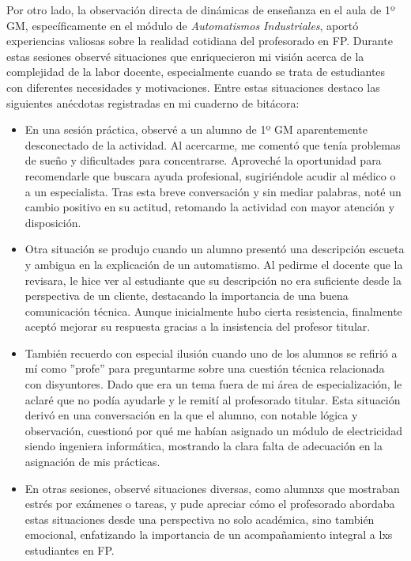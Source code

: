Por otro lado, la observación directa de dinámicas de enseñanza en el aula de 1º GM, específicamente en el módulo de \textit{Automatismos Industriales}, aportó experiencias valiosas sobre la realidad cotidiana del profesorado en FP. Durante estas sesiones observé situaciones que enriquecieron mi visión acerca de la complejidad de la labor docente, especialmente cuando se trata de estudiantes con diferentes necesidades y motivaciones. Entre estas situaciones destaco las siguientes anécdotas registradas en mi cuaderno de bitácora:

\begin{itemize} %
    \item En una sesión práctica, observé a un alumno de 1º GM aparentemente desconectado de la actividad. Al acercarme, me comentó que tenía problemas de sueño y dificultades para concentrarse. Aproveché la oportunidad para recomendarle que buscara ayuda profesional, sugiriéndole acudir al médico o a un especialista. Tras esta breve conversación y sin mediar palabras, noté un cambio positivo en su actitud, retomando la actividad con mayor atención y disposición.
    
    \item Otra situación se produjo cuando un alumno presentó una descripción escueta y ambigua en la explicación de un automatismo. Al pedirme el docente que la revisara, le hice ver al estudiante que su descripción no era suficiente desde la perspectiva de un cliente, destacando la importancia de una buena comunicación técnica. Aunque inicialmente hubo cierta resistencia, finalmente aceptó mejorar su respuesta gracias a la insistencia del profesor titular.
    
    \item También recuerdo con especial ilusión cuando uno de los alumnos se refirió a mí como ''profe'' para preguntarme sobre una cuestión técnica relacionada con disyuntores. Dado que era un tema fuera de mi área de especialización, le aclaré que no podía ayudarle y le remití al profesorado titular. Esta situación derivó en una conversación en la que el alumno, con notable lógica y observación, cuestionó por qué me habían asignado un módulo de electricidad siendo ingeniera informática, mostrando la clara falta de adecuación en la asignación de mis prácticas.
    
    \item En otras sesiones, observé situaciones diversas, como alumnxs que mostraban estrés por exámenes o tareas, y pude apreciar cómo el profesorado abordaba estas situaciones desde una perspectiva no solo académica, sino también emocional, enfatizando la importancia de un acompañamiento integral a lxs estudiantes en FP.
\end{itemize}

